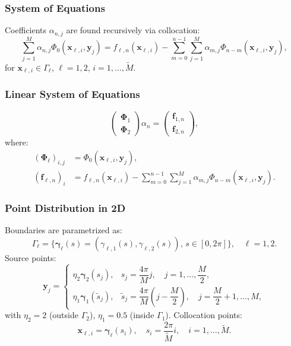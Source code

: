 \documentclass{beamer}
\newcommand{\bvec}[1]{\boldsymbol{#1}} %
\begin{document}
\begin{frame}
    \frametitle{System of Equations}
    Coefficients \( \alpha_{n, j} \) are found recursively via collocation:
    \begin{equation}
        \sum_{j=1}^M \alpha_{n, j} \Phi_0(\bvec{x}_{\ell, i}, \bvec{y}_j) = f_{\ell, n}(\bvec{x}_{\ell, i}) - \sum_{m=0}^{n-1} \sum_{j=1}^M \alpha_{m, j} \Phi_{n-m}(\bvec{x}_{\ell, i}, \bvec{y}_j),
    \end{equation}
    for \( \bvec{x}_{\ell, i} \in \Gamma_\ell \), \( \ell = 1, 2 \), \( i = 1, \ldots, \tilde{M} \).
\end{frame}

\begin{frame}
    \frametitle{Linear System of Equations}
    \begin{equation}
        \begin{pmatrix}
            \bvec{\Phi}_1 \\
            \bvec{\Phi}_2
        \end{pmatrix}
        \alpha_n =
        \begin{pmatrix}
            \bvec{f}_{1,n} \\
            \bvec{f}_{2,n}
        \end{pmatrix},
    \end{equation}
    where:
    \begin{align}
        (\bvec{\Phi}_\ell)_{i,j} &= \Phi_0(\bvec{x}_{\ell,i}, \bvec{y}_j), \\
        (\bvec{f}_{\ell,n})_i &= f_{\ell,n}(\bvec{x}_{\ell,i}) - \sum_{m=0}^{n-1} \sum_{j=1}^M \alpha_{m,j} \Phi_{n-m}(\bvec{x}_{\ell,i}, \bvec{y}_j).
    \end{align}
\end{frame}

\begin{frame}
    \frametitle{Point Distribution in 2D}
    Boundaries are parametrized as:
    \begin{equation}
        \Gamma_\ell = \{ \bvec{\gamma}_\ell(s) = (\gamma_{\ell,1}(s), \gamma_{\ell,2}(s)), \, s \in [0, 2\pi] \}, \quad \ell = 1, 2.
    \end{equation}
    Source points:
    \begin{equation}
        \bvec{y}_j =
        \begin{cases}
            \eta_2 \bvec{\gamma}_2(s_j), & s_j = \dfrac{4\pi}{M} j, \quad j = 1, \ldots, \dfrac{M}{2}, \\
            \eta_1 \bvec{\gamma}_1(\tilde{s}_j), & \tilde{s}_j = \dfrac{4\pi}{M} (j - \dfrac{M}{2}), \quad j = \dfrac{M}{2} + 1, \ldots, M,
        \end{cases}
    \end{equation}
    with \( \eta_2 = 2 \) (outside \( \Gamma_2 \)), \( \eta_1 = 0.5 \) (inside \( \Gamma_1 \)). Collocation points:
    \begin{equation}
        \bvec{x}_{\ell,i} = \bvec{\gamma}_\ell(s_i), \quad s_i = \dfrac{2\pi}{\tilde{M}} i, \quad i = 1, \ldots, \tilde{M}.
    \end{equation}
\end{frame}
\end{document}
